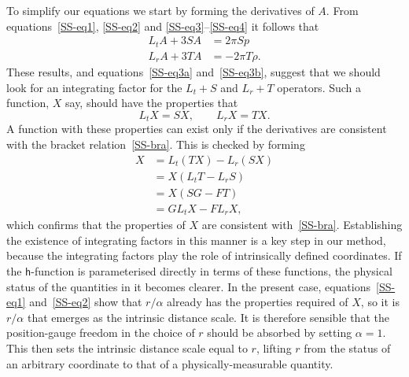 \documentclass[a4paper]{article}
\numberwithin{equation}{section}
\newcommand{\nn}{\nonumber}
\newcommand{\alp}{\alpha}
\newcommand{\lih}{\mathsf{h}}
\begin{document}
To simplify our equations we start by forming the derivatives of $A$.
From equations~\eqref{SS-eq1}, \eqref{SS-eq2} and
\eqref{SS-eq3}--\eqref{SS-eq4} it follows that
%
\begin{align}
L_t A + 3SA &= 2\pi Sp \\
L_r A + 3TA &= - 2\pi T\rho.
\end{align}
%
These results, and equations~\eqref{SS-eq3a} and~\eqref{SS-eq3b}, suggest that
we should look for an integrating factor for the $L_t+S$ and $L_r+T$
operators.  Such a function, $X$ say, should have the properties that
%
\begin{equation}
L_t X = SX, \qquad  L_r X = TX. 
\label{SS-Xeq}
\end{equation}
%
A function with these properties can exist only if the derivatives are
consistent with the bracket relation~\eqref{SS-bra}.  This is checked by
forming
%
\begin{align}
[L_t, L_r] X 
&= L_t(TX) - L_r (SX) \nn \\
&= X (L_t T - L_r S) \nn \\
&= X (SG-FT) \nn \\
&= G L_t X - F L_r X,
\label{SS-Xbra}
\end{align}
%
which confirms that the properties of $X$ are consistent
with~\eqref{SS-bra}.  Establishing the existence of integrating
factors in this manner is a key step in our method, because the
integrating factors play the role of intrinsically defined
coordinates.  If the $\lih$-function is parameterised directly in
terms of these functions, the physical status of the quantities in it
becomes clearer.  In the present case, equations~\eqref{SS-eq1}
and~\eqref{SS-eq2} show that $r/\alp$ already has the properties
required of $X$, so it is $r/\alp$ that emerges as the intrinsic
distance scale.  It is therefore sensible that the position-gauge
freedom in the choice of $r$ should be absorbed by setting $\alp=1$.
This then sets the intrinsic distance scale equal to $r$, lifting $r$
from the status of an arbitrary coordinate to that of a
physically-measurable quantity.
\end{document}
